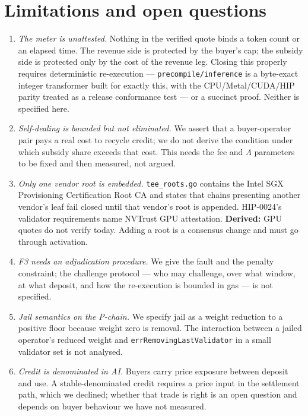 \documentclass[11pt,a4paper]{article}
\theoremstyle{definition}
\theoremstyle{remark}
\newcommand{\code}[1]{\texttt{#1}}
\begin{document}
\section{Limitations and open questions}
\label{sec:open}

\begin{enumerate}[leftmargin=2.2em]
\item \emph{The meter is unattested.} Nothing in the verified quote binds a
token count or an elapsed time. The revenue side is protected by the buyer's cap;
the subsidy side is protected only by the cost of the revenue leg. Closing this
properly requires deterministic re-execution --- \code{precompile/inference} is
a byte-exact integer transformer built for exactly this, with the
CPU/Metal/CUDA/HIP parity treated as a release conformance test --- or a
succinct proof. Neither is specified here.
\item \emph{Self-dealing is bounded but not eliminated.} We assert that a
buyer-operator pair pays a real cost to recycle credit; we do not derive the
condition under which subsidy share exceeds that cost. This needs the fee and
$\Lambda$ parameters to be fixed and then measured, not argued.
\item \emph{Only one vendor root is embedded.} \code{tee\_roots.go} contains the
Intel SGX Provisioning Certification Root CA and states that chains presenting
another vendor's leaf fail closed until that vendor's root is appended.
HIP-0024's validator requirements name NVTrust GPU attestation. \textbf{Derived:}
GPU quotes do not verify today. Adding a root is a consensus change and must go
through activation.
\item \emph{F3 needs an adjudication procedure.} We give the fault and the
penalty constraint; the challenge protocol --- who may challenge, over what
window, at what deposit, and how the re-execution is bounded in gas --- is not
specified.
\item \emph{Jail semantics on the P-chain.} We specify jail as a weight
reduction to a positive floor because weight zero is removal. The interaction
between a jailed operator's reduced weight and \code{errRemovingLastValidator}
in a small validator set is not analysed.
\item \emph{Credit is denominated in AI.} Buyers carry price exposure between
deposit and use. A stable-denominated credit requires a price input in the
settlement path, which we declined; whether that trade is right is an open
question and depends on buyer behaviour we have not measured.
\end{enumerate}
\end{document}
